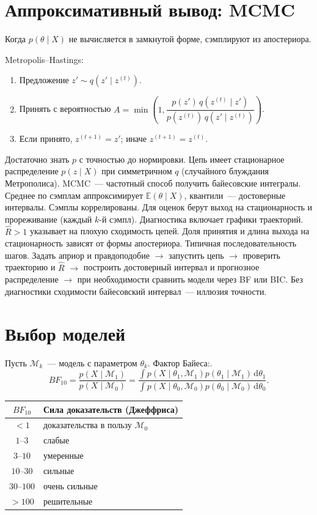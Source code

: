 \section{Аппроксимативный вывод: MCMC}

Когда $p(\theta\mid X)$ не вычисляется в замкнутой форме, сэмплируют из апостериора.

Metropolis--Hastings:
\begin{enumerate}
    \item Предложение $z'\sim q(z'\mid z^{(t)})$.
    \item Принять с вероятностью
          $A=\min\!\left(1,\dfrac{p(z')\,q(z^{(t)}\mid z')}{p(z^{(t)})\,q(z'\mid z^{(t)})}\right)$.
    \item Если принято, $z^{(t+1)}=z'$; иначе $z^{(t+1)}=z^{(t)}$.
\end{enumerate}
Достаточно знать $p$ с точностью до нормировки. Цепь имеет стационарное распределение $p(z\mid X)$ при симметричном $q$ (случайного блуждания Метрополиса).
MCMC~--- частотный способ получить байесовские интегралы. Среднее по сэмплам аппроксимирует $\mathbb{E}(\theta\mid X)$, квантили~--- достоверные интервалы.
Сэмплы коррелированы. Для оценок берут выход на стационарность и прореживание (каждый $k$-й сэмпл). Диагностика включает графики траекторий. $\hat R>1$ указывает на плохую сходимость цепей.
Доля принятия и длина выхода на стационарность зависят от формы апостериора. Типичная последовательность шагов. Задать априор и правдоподобие $\to$ запустить цепь $\to$ проверить траекторию и $\hat R$ $\to$ построить достоверный интервал и прогнозное распределение $\to$ при необходимости сравнить модели через BF или BIC.
Без диагностики сходимости байесовский интервал~--- иллюзия точности.

\section{Выбор моделей}

Пусть $\mathcal{M}_k$~--- модель с параметром $\theta_k$.
Фактор Байеса:.\[ BF_{10}=\frac{p(X\mid\mathcal{M}_1)}{p(X\mid\mathcal{M}_0)}= \frac{\int p(X\mid\theta_1,\mathcal{M}_1)p(\theta_1\mid\mathcal{M}_1)\,\mathrm{d}\theta_1} {\int p(X\mid\theta_0,\mathcal{M}_0)p(\theta_0\mid\mathcal{M}_0)\,\mathrm{d}\theta_0}.
          \]

\begin{center}
\small
\begin{tabular}{cl}
\toprule
$BF_{10}$ & Сила доказательств (Джеффриса) \\
\midrule
$<1$ & доказательства в пользу $\mathcal{M}_0$ \\
$1$--$3$ & слабые \\
$3$--$10$ & умеренные \\
$10$--$30$ & сильные \\
$30$--$100$ & очень сильные \\
$>100$ & решительные \\
\bottomrule
\end{tabular}
\end{center}

